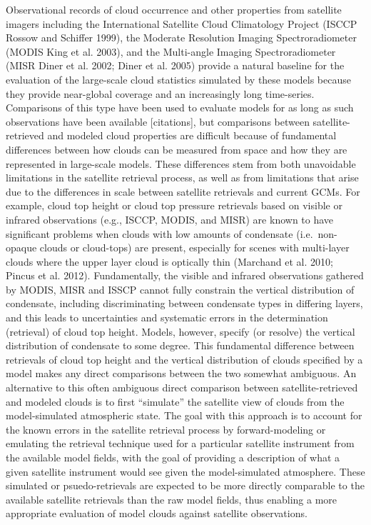Observational records of cloud occurrence and other properties from
satellite imagers including the International Satellite Cloud
Climatology Project (ISCCP Rossow and Schiffer 1999), the Moderate
Resolution Imaging Spectroradiometer (MODIS King et al. 2003), and the
Multi-angle Imaging Spectroradiometer (MISR Diner et al. 2002; Diner et
al. 2005) provide a natural baseline for the evaluation of the
large-scale cloud statistics simulated by these models because they
provide near-global coverage and an increasingly long time-series.
Comparisons of this type have been used to evaluate models for as long
as such observations have been available {[}citations{]}, but
comparisons between satellite-retrieved and modeled cloud properties are
difficult because of fundamental differences between how clouds can be
measured from space and how they are represented in large-scale models.
These differences stem from both unavoidable limitations in the
satellite retrieval process, as well as from limitations that arise due
to the differences in scale between satellite retrievals and current
GCMs. For example, cloud top height or cloud top pressure retrievals
based on visible or infrared observations (e.g., ISCCP, MODIS, and MISR)
are known to have significant problems when clouds with low amounts of
condensate (i.e.~non-opaque clouds or cloud-tops) are present,
especially for scenes with multi-layer clouds where the upper layer
cloud is optically thin (Marchand et al. 2010; Pincus et al. 2012).
Fundamentally, the visible and infrared observations gathered by MODIS,
MISR and ISSCP cannot fully constrain the vertical distribution of
condensate, including discriminating between condensate types in
differing layers, and this leads to uncertainties and systematic errors
in the determination (retrieval) of cloud top height. Models, however,
specify (or resolve) the vertical distribution of condensate to some
degree. This fundamental difference between retrievals of cloud top
height and the vertical distribution of clouds specified by a model
makes any direct comparisons between the two somewhat ambiguous. An
alternative to this often ambiguous direct comparison between
satellite-retrieved and modeled clouds is to first ``simulate'' the
satellite view of clouds from the model-simulated atmospheric state. The
goal with this approach is to account for the known errors in the
satellite retrieval process by forward-modeling or emulating the
retrieval technique used for a particular satellite instrument from the
available model fields, with the goal of providing a description of what
a given satellite instrument would see given the model-simulated
atmosphere. These simulated or psuedo-retrievals are expected to be more
directly comparable to the available satellite retrievals than the raw
model fields, thus enabling a more appropriate evaluation of model
clouds against satellite observations.

